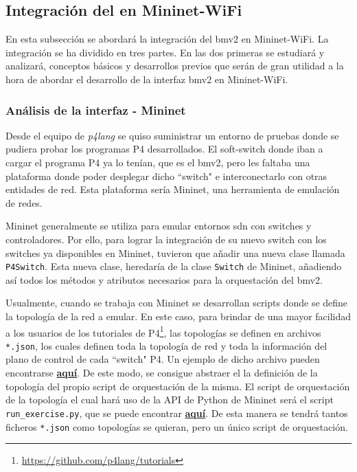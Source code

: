 \subsection{Integración del  en Mininet-WiFi}
\label{mn-wifi_bmv2_integration}

En esta subsección se abordará la integración del \gls{bmv2} en Mininet-WiFi. La integración se ha dividido en tres partes. En las dos primeras se estudiará y analizará, conceptos básicos y desarrollos previos que serán de gran utilidad a la hora de abordar el desarrollo de la interfaz \gls{bmv2} en Mininet-WiFi.

\subsubsection{Análisis de la interfaz  - Mininet}

Desde el equipo de \textit{p4lang} se quiso suministrar un entorno de pruebas donde se pudiera probar los programas P4 desarrollados. El soft-switch donde iban a cargar el programa P4 ya lo tenían, que es el \gls{bmv2}, pero les faltaba una plataforma donde poder desplegar dicho ``switch" e interconectarlo con otras entidades de red. Esta plataforma sería Mininet, una herramienta de emulación de redes.\\
\par

Mininet generalmente se utiliza para emular entornos \gls{sdn} con switches y controladores. Por ello, para lograr la integración de su nuevo switch con los switches ya disponibles en Mininet, tuvieron que añadir una nueva clase llamada \texttt{P4Switch}. Esta nueva clase, heredaría de la clase \texttt{Switch} de Mininet, añadiendo así todos los métodos y atributos necesarios para la orquestación del \gls{bmv2}.\\
\par

Usualmente, cuando se trabaja con Mininet se desarrollan scripts donde se define la topología de la red a emular. En este caso, para brindar de una mayor facilidad a los usuarios de los tutoriales de P4\footnote{\url{https://github.com/p4lang/tutorials}}, las topologías se definen en archivos \texttt{*.json}, los cuales definen toda la topología de red y toda la información del plano de control de cada ``switch" P4. Un ejemplo de dicho archivo pueden encontrarse \href{https://github.com/davidcawork/TFG/blob/master/src/use_cases/p4/case01/scenario/topology.json}{\textbf{aquí}}. De este modo, se consigue abstraer el la definición de la topología del propio script de orquestación de la misma. El script de orquestación de la topología el cual hará uso de la API de Python de Mininet será el script \texttt{run\_exercise.py}, que se puede encontrar \href{https://github.com/davidcawork/TFG/blob/master/src/use_cases/p4/utils/run_exercise.py}{\textbf{aquí}}. De esta manera se tendrá tantos ficheros \texttt{*.json} como topologías se quieran, pero un único script de orquestación.\\
\par


